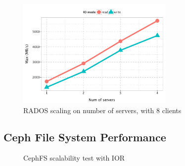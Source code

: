 \begin{figure}[htb]
\centering
\includegraphics[width=3in]{data/rados_server}
\caption{RADOS scaling on number of servers, with 8 clients}
\label{fig:oss-scale}
\end{figure}

\subsection{Ceph File System Performance}
\label{sec:ior-initial}

\begin{figure}[!t]

\centerline{
\hfil
{}
}%
\caption{CephFS scalability test with IOR}

\end{figure}


